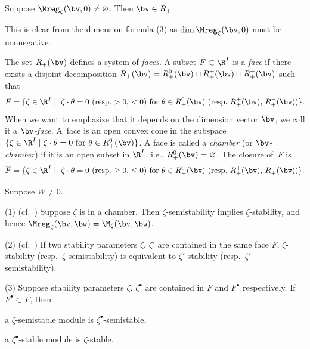 \begin{Lemma}\label{lem:nondeg}
  Suppose $\Mreg_\zeta(\bv,0)\neq\varnothing$. Then $\bv \in R_+$.
\end{Lemma}

This is clear from the dimension formula (3) as
$\dim \Mreg_\zeta(\bv,0)$ must be nonnegative.

The set $R_+(\bv)$ def\/ines a system of {\it faces\/}. A subset
$F\subset \R^I$ is a {\it face\/} if there exists a disjoint
decomposition $R_+(\bv) = R_+^0(\bv) \sqcup R_+^+(\bv) \sqcup
R_+^-(\bv)$ such that
\begin{equation*}
    F = \{ \zeta\in \R^I \mid \text{
     $\zeta\cdot \theta = 0$ (resp.\ $> 0$, $< 0$) for
    $\theta\in R_+^0(\bv)$ (resp.\ $R_+^+(\bv)$, $R_+^-(\bv)$)}\}.
\end{equation*}
%
When we want to emphasize that it depends on the dimension vector
$\bv$, we call it a {\it $\bv$-face}.
%
A~face is an open convex cone in the subspace $\{ \zeta\in\R^I \mid
\text{$\zeta\cdot\theta = 0$ for $\theta\in R_+^0(\bv)$}\}$. A face is
called a {\it chamber\/} (or {\it $\bv$-chamber\/}) if it is an open
subset in $\R^I$, i.e., $R_+^0(\bv) = \varnothing$. The closure of~$F$
is
\begin{equation*}
    \overline{F} = \{ \zeta\in \R^I \mid \text{
     $\zeta\cdot \theta = 0$ (resp.\ $\ge 0$, $\le 0$) for
    $\theta\in R_+^0(\bv)$ (resp.\ $R_+^+(\bv)$, $R_+^-(\bv)$)}\}.
\end{equation*}

\begin{Lemma}\label{lem:face}
  Suppose $W\neq 0$.

  \textup{(1) (cf.\ \cite[2.8]{Na-quiver})} Suppose $\zeta$ is in a
  chamber. Then $\zeta$-semistability implies $\zeta$-stability, and hence
  $\Mreg_\zeta(\bv,\bw) = \M_\zeta(\bv,\bw)$.

  \textup{(2) (cf.\ \cite[1.4]{Na-ADHM})} If two stability parameters
  $\zeta$, $\zeta'$ are contained in the same face $F$,
  $\zeta$-stability \textup(resp.\ $\zeta$-semistability\textup) is
  equivalent to $\zeta'$-stability \textup(resp.\
  $\zeta'$-semistability\textup).

  \textup{(3)} Suppose stability parameters $\zeta$, $\zeta^\bullet$ are
  contained in $F$ and $F^\bullet$ respectively. If $F^\bullet\subset
  \overline{F}$, then
  \begin{aenume}\itemsep=0pt
    \item a $\zeta$-semistable module is $\zeta^\bullet$-semistable,
    \item a $\zeta^\bullet$-stable module is $\zeta$-stable.
  \end{aenume}
\end{Lemma}

